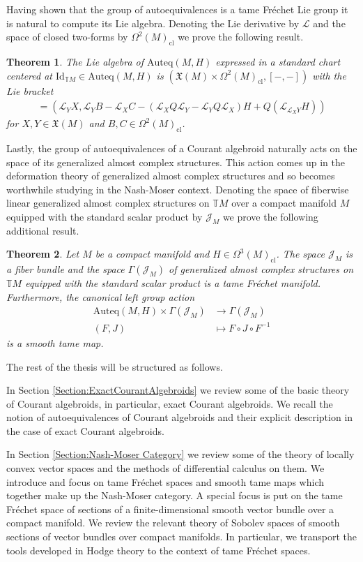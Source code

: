 \documentclass[12pt,a4paper]{article}
\theoremstyle{plain}
\newtheorem{theorem}{Theorem}[subsection]
\theoremstyle{definition}
\newcommand{\VFs}{\mathfrak{X}(M)}
\newcommand{\Forms}[1]{\Omega^{#1}(M)}
\newcommand{\ClForms}[1]{\Forms{#1}_{\mathrm{cl}}}
\newcommand{\LieD}{\mathcal{L}}
\newcommand{\Auteq}{\mathrm{Auteq}(M,H)}
\newcommand{\GenTM}{\mathbb TM}
\newcommand{\Jcal}{\mathcal{J}}
\begin{document}
Having shown that the group of autoequivalences is a tame Fréchet Lie group it is natural to compute its Lie algebra. Denoting the Lie derivative by $\LieD$ and the space of closed two-forms by $\ClForms{2}$ we prove the following result.

\begin{theorem}
\label{MainThm:LieAlg}
The Lie algebra of $\Auteq$ expressed in a standard chart centered at $\mathrm{Id}_{\GenTM}\in \Auteq$ is
$(\VFs\times \ClForms{2},[-,-])$ with the Lie bracket
\begin{align*}
    [(X,B),(Y,C)]=(\LieD_YX,\LieD_YB-\LieD_XC-(\LieD_XQ\LieD_Y-\LieD_YQ\LieD_X)H+Q(\LieD_{\LieD_XY}H))
\end{align*}
for $X,Y\in \VFs$ and $B,C\in \ClForms{2}$. 
\end{theorem}


Lastly, the group of autoequivalences of a Courant algebroid naturally acts on the space of its generalized almost complex structures. This action comes up in the deformation theory of generalized almost complex structures and so becomes worthwhile studying in the Nash-Moser context. Denoting the space of fiberwise linear generalized almost complex structures on $\GenTM$ over a compact manifold $M$ equipped with the standard scalar product by $\Jcal_M$ we prove the following additional result.

\begin{theorem}
\label{MainThm:Jcal_M}
Let $M$ be a compact manifold and $H\in \ClForms{3}$. The space $\Jcal_M$ is a fiber bundle and the space $\Gamma(\Jcal_M)$ of generalized almost complex structures on $\GenTM$ equipped with the standard scalar product is a tame Fréchet manifold.
Furthermore, the canonical left group action 
\begin{align*}
    \Auteq\times \Gamma(\Jcal_M)&\longrightarrow \Gamma(\Jcal_M)\\
    (F,J)&\longmapsto F\circ J\circ F^{-1}
\end{align*}
is a smooth tame map.
\end{theorem}

The rest of the thesis will be structured as follows.

In Section \ref{Section:ExactCourantAlgebroids} we review some of the basic theory of Courant algebroids, in particular, exact Courant algebroids. We recall the notion of autoequivalences of Courant algebroids and their explicit description in the case of exact Courant algebroids.

In Section \ref{Section:Nash-Moser Category} we review some of the theory of locally convex vector spaces and the methods of differential calculus on them. We introduce and focus on tame Fréchet spaces and smooth tame maps which together make up the Nash-Moser category.
A special focus is put on the tame Fréchet space of sections of a finite-dimensional smooth vector bundle over a compact manifold. We review the relevant theory of Sobolev spaces of smooth sections of vector bundles over compact manifolds. In particular, we transport the tools developed in Hodge theory to the context of tame Fréchet spaces. 
\end{document}
